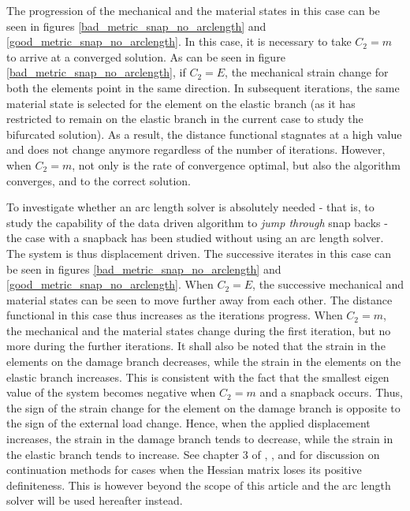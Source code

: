 \documentclass[10pt]{elsarticle}
\begin{document}
The progression of the mechanical and the material states in this case can be seen in figures \ref{bad_metric_snap_no_arclength} and \ref{good_metric_snap_no_arclength}. In this case, it is necessary to take $C_2=m$ to arrive at a converged solution. As can be seen in figure \ref{bad_metric_snap_no_arclength}, if $C_2=E$, the mechanical strain change for both the elements point in the same direction. In subsequent iterations, the same material state is selected for the element on the elastic branch (as it has restricted to remain on the elastic branch in the current case to study the bifurcated solution). As a result, the distance functional stagnates at a high value and does not change anymore regardless of the number of iterations. However, when $C_2=m$, not only is the rate of convergence optimal, but also the algorithm converges, and to the correct solution.

To investigate whether an arc length solver is absolutely needed - that is, to study the capability of the data driven algorithm to \textit{jump through} snap backs - the case with a snapback has been studied without using an arc length solver. The system is thus displacement driven. The successive iterates in this case can be seen in figures \ref{bad_metric_snap_no_arclength} and \ref{good_metric_snap_no_arclength}. When $C_2=E$, the successive mechanical and material states can be seen to move further away from each other. The distance functional in this case thus increases as the iterations progress. When $C_2=m$, the mechanical and the material states change during the first iteration, but no more during the further iterations. It shall also be noted that the strain in the elements on the damage branch decreases, while the strain in the elements on the elastic branch increases. This is consistent with the fact that the smallest eigen value of the system becomes negative when $C_2=m$ and a snapback occurs. Thus, the sign of the strain change for the element on the damage branch is opposite to the sign of the external load change. Hence, when the applied displacement increases, the strain in the damage branch tends to decrease, while the strain in the elastic branch tends to increase. See chapter 3 of \cite{deBorst1986}, \cite{deBorst1987b}, and \cite{Baldelli2021} for discussion on continuation methods for cases when the Hessian matrix loses its positive definiteness. This is however beyond the scope of this article and the arc length solver will be used hereafter instead.
\end{document}
